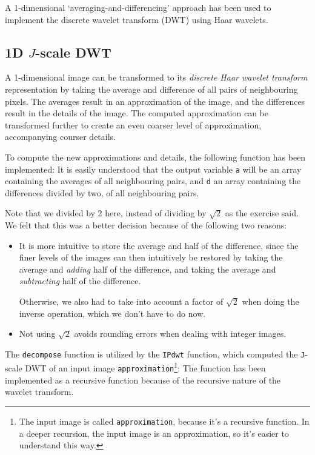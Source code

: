 A 1-dimensional `averaging-and-differencing' approach has been used to implement the discrete wavelet transform (DWT) using Haar wavelets.

\subsection{\texorpdfstring{1D \(J\)-scale DWT}{1D J-scale DWT}}
A 1-dimensional image can be transformed to its \emph{discrete Haar wavelet transform} representation by taking the average and difference of all pairs of neighbouring pixels.
The averages result in an approximation of the image, and the differences result in the details of the image.
The computed approximation can be transformed further to create an even coarser level of approximation, accompanying courser details.

To compute the new approximations and details, the following function has been implemented:
It is easily understood that the output variable \texttt{a} will be an array containing the averages of all neighbouring pairs, and \texttt{d} an array containing the differences divided by two, of all neighbouring pairs.

Note that we divided by 2 here, instead of dividing by \(\sqrt{2}\) as the exercise said.
We felt that this was a better decision because of the following two reasons:
\begin{itemize}
  \item It is more intuitive to store the average and half of the difference, since the finer levels of the images can then intuitively be restored by taking the average and \emph{adding} half of the difference, and taking the average and \emph{subtracting} half of the difference.

  Otherwise, we also had to take into account a factor of \(\sqrt{2}\) when doing the inverse operation, which we don't have to do now.
  \item Not using \(\sqrt{2}\) avoids rounding errors when dealing with integer images.
\end{itemize}

The \texttt{decompose} function is utilized by the \texttt{IPdwt} function, which computed the \texttt{J}-scale DWT of an input image \texttt{approximation}\footnote{The input image is called \texttt{approximation}, because it's a recursive function. In a deeper recursion, the input image is an approximation, so it's easier to understand this way.}:
The function has been implemented as a recursive function because of the recursive nature of the wavelet transform.

